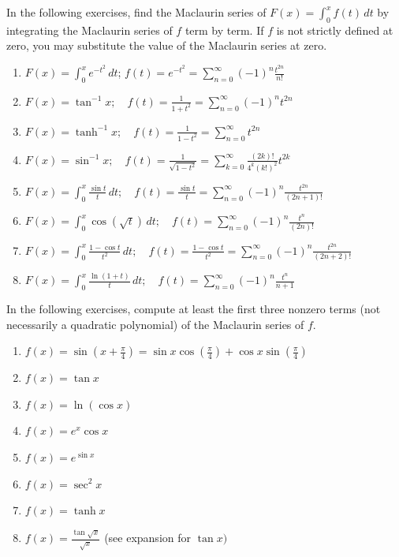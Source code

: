 \documentclass{exercises}
\begin{document}
In the following exercises, find the Maclaurin series of $F(x)=\int_{0}^{x}f(t)\,dt$ by integrating the Maclaurin series of $f$ term by term. If $f$ is not strictly defined at zero, you may substitute the value of the Maclaurin series at zero.

\begin{enumerate}[resume]
\item $F(x)=\int_{0}^{x}e^{-t^{2}}\,dt$; $f(t)=e^{-t^{2}}=\sum_{n=0}^{\infty}{(-1)}^{n}\frac{t^{2n}}{n!}$
\item $F(x)=\tan^{-1}x;\quad f(t)=\frac{1}{1+t^{2}}=\sum_{n=0}^{\infty}{(-1)}^{n}t^{2n}$
\item $F(x)=\tanh^{-1}x;\quad f(t)=\frac{1}{1-t^{2}}=\sum_{n=0}^{\infty}t^{2n}$
\item $F(x)=\sin^{-1}x;\quad f(t)=\frac{1}{\sqrt{1-t^{2}}}=\sum_{k=0}^{\infty}\frac{(2k)!}{4^{k}(k!)^{2}}t^{2k}$
\item $F(x)=\int_{0}^{x}\frac{\sin t}{t}\,dt;\quad f(t)=\frac{\sin t}{t}=\sum_{n=0}^{\infty}{(-1)}^{n}\frac{t^{2n}}{(2n+1)!}$
\item $F(x)=\int_{0}^{x}\cos(\sqrt{t})\,dt;\quad f(t)=\sum_{n=0}^{\infty}{(-1)}^{n}\frac{t^{n}}{(2n)!}$
\item $F(x)=\int_{0}^{x}\frac{1-\cos t}{t^{2}}\,dt;\quad f(t)=\frac{1-\cos t}{t^{2}}=\sum_{n=0}^{\infty}{(-1)}^{n}\frac{t^{2n}}{(2n+2)!}$
\item $F(x)=\int_{0}^{x}\frac{\ln (1+t)}{t}\,dt;\quad f(t)=\sum_{n=0}^{\infty}{(-1)}^{n}\frac{t^{n}}{n+1}$
\end{enumerate}

In the following exercises, compute at least the first three nonzero terms (not necessarily a quadratic polynomial) of the Maclaurin series of $f$.

\begin{enumerate}[resume]
\item $f(x)=\sin(x+\frac{\pi}{4})=\sin x\cos(\frac{\pi}{4})+\cos x\sin(\frac{\pi}{4})$
\item $f(x)=\tan x$
\item $f(x)=\ln (\cos x)$
\item $f(x)=e^{x}\cos x$
\item $f(x)=e^{\sin x}$
\item $f(x)=\sec^{2}x$
\item $f(x)=\tanh x$
\item $f(x)=\frac{\tan \sqrt{x}}{\sqrt{x}}$ (see expansion for $\tan x)$
\end{enumerate}
\end{document}

